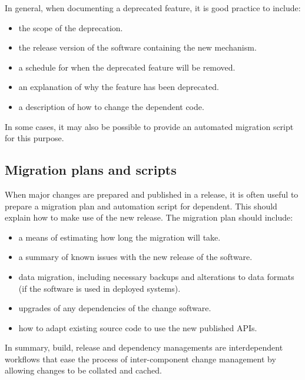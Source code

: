 \documentclass[a4paper, openany]{memoir}
\begin{document}
In general, when documenting a deprecated feature, it is good practice to include:
\begin{itemize}
    \item the scope of the deprecation.
    \item the release version of the software containing the new mechanism.
    \item a schedule for when the deprecated feature will be removed.
    \item an explanation of why the feature has been deprecated.
    \item a description of how to change the dependent code.
\end{itemize}
In some cases, it may also be possible to provide an automated migration script for this purpose.

\subsection{Migration plans and scripts}
When major changes are prepared and published in a release, it is often useful to prepare a migration plan and automation script for dependent. This should explain how to make use of the new release. The migration plan should include:
\begin{itemize}
    \item a means of estimating how long the migration will take.
    \item a summary of known issues with the new release of the software.
    \item data migration, including necessary backups and alterations to data formats (if the software is used in deployed systems).
    \item upgrades of any dependencies of the change software.
    \item how to adapt existing source code to use the new published APIs.
\end{itemize}

In summary, build, release and dependency managements are interdependent workflows that ease the process of inter-component change management by allowing changes to be collated and cached.
\end{document}
